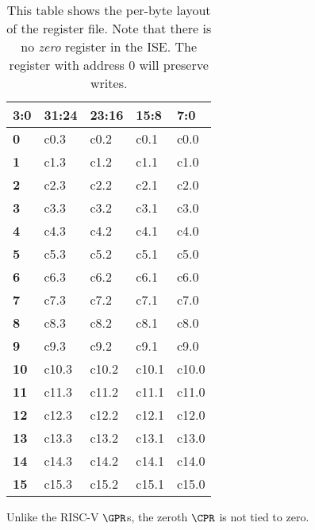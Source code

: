 \begin{table}[h!]
\centering
\begin{tabular}{|l|l l l l|}
\hline
\multicolumn{1}{|l|}{3:0} & \textbf{31:24} & \textbf{23:16} & \textbf{15:8} & \textbf{7:0} \\ \hline
\textbf{0 }   & c0.3       & c0.2       & c0.1       & c0.0       \\ \hline
\textbf{1 }   & c1.3       & c1.2       & c1.1       & c1.0       \\ \hline
\textbf{2 }   & c2.3       & c2.2       & c2.1       & c2.0       \\ \hline
\textbf{3 }   & c3.3       & c3.2       & c3.1       & c3.0       \\ \hline
\textbf{4 }   & c4.3       & c4.2       & c4.1       & c4.0       \\ \hline
\textbf{5 }   & c5.3       & c5.2       & c5.1       & c5.0       \\ \hline
\textbf{6 }   & c6.3       & c6.2       & c6.1       & c6.0       \\ \hline
\textbf{7 }   & c7.3       & c7.2       & c7.1       & c7.0       \\ \hline
\textbf{8 }   & c8.3       & c8.2       & c8.1       & c8.0       \\ \hline
\textbf{9 }   & c9.3       & c9.2       & c9.1       & c9.0       \\ \hline
\textbf{10}   & c10.3      & c10.2      & c10.1      & c10.0      \\ \hline
\textbf{11}   & c11.3      & c11.2      & c11.1      & c11.0      \\ \hline
\textbf{12}   & c12.3      & c12.2      & c12.1      & c12.0      \\ \hline
\textbf{13}   & c13.3      & c13.2      & c13.1      & c13.0      \\ \hline
\textbf{14}   & c14.3      & c14.2      & c14.1      & c14.0      \\ \hline
\textbf{15}   & c15.3      & c15.2      & c15.1      & c15.0      \\ \hline
\end{tabular}
\caption{This table shows the per-byte layout of the register file. Note
that there is no {\em zero} register in the ISE. The register with
address $0$ will preserve writes.}
\label{tab:state-addr}
\end{table}

Unlike the RISC-V $\GPR$s, the zeroth $\CPR$ is not tied to zero.


